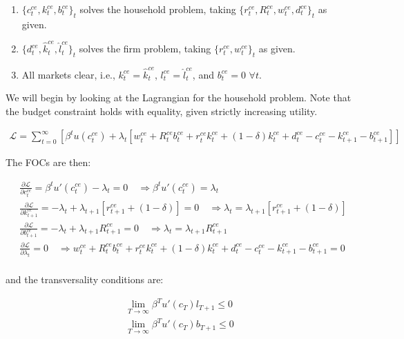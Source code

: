 \begin{enumerate}
    \item $\{c_t^{ce}, k_{t}^{ce}, b_{t}^{ce}\}_t$ solves the household problem, taking $\{r_t^{ce}, R_t^{ce}, w_t^{ce}, d_t^{ce}\}_t$ as given.
    \item $\{d_t^{ce}, \hat{k}_t^{ce}, \hat{l}_t^{ce}\}_t$ solves the firm problem, taking $\{r_t^{ce}, w_t^{ce}\}_t$ as given.
    \item All markets clear, i.e., $k_t^{ce} = \hat{k}_t^{ce}$, $l_t^{ce} = \hat{l}_t^{ce}$, and $b_t^{ce} = 0$ $\forall t$.
\end{enumerate}

We will begin by looking at the Lagrangian for the household problem.
Note that the budget constraint holds with equality, given strictly 
increasing utility. 

\begin{align}
    \mathcal{L} = \sum_{t=0}^\infty \left[\beta^t u(c_t^{ce}) + \lambda_t\left[w_t^{ce} + R_t^{ce}b_t^{ce} + r_t^{ce}k_t^{ce} + (1 - \delta)k_t^{ce} + d_t^{ce} - c_t^{ce} - k_{t+1}^{ce} - b_{t+1}^{ce}\right]\right]
\end{align}

The FOCs are then:

\begin{align}
    &\frac{\partial \mathcal{L}}{\partial c_t^{ce}} = \beta^t u'(c_t^{ce}) - \lambda_t = 0 \quad \Rightarrow \beta^t u'(c_t^{ce}) =\lambda_t \label{eq:pset_2023_24_ps1_q3_golosov_foc1} \\
    &\frac{\partial \mathcal{L}}{\partial k_{t+1}^{ce}} = -\lambda_t + \lambda_{t+1}\left[r_{t+1}^{ce} + (1 - \delta)\right] = 0 \quad \Rightarrow \lambda_t = \lambda_{t+1}\left[r_{t+1}^{ce} + (1 - \delta)\right] \label{eq:pset_2023_24_ps1_q3_golosov_foc2} \\
    &\frac{\partial \mathcal{L}}{\partial b_{t+1}^{ce}} = -\lambda_t + \lambda_{t+1}R_{t+1}^{ce} = 0 \quad \Rightarrow \lambda_t = \lambda_{t+1}R_{t+1}^{ce} \label{eq:pset_2023_24_ps1_q3_golosov_foc3} \\
    &\frac{\partial \mathcal{L}}{\partial \lambda_t} = 0 \quad \Rightarrow w_t^{ce} + R_t^{ce}b_t^{ce} + r_t^{ce}k_t^{ce} + (1 - \delta)k_t^{ce} + d_t^{ce} - c_t^{ce} - k_{t+1}^{ce} - b_{t+1}^{ce} = 0 \label{eq:pset_2023_24_ps1_q3_golosov_foc4} \\
\end{align}

and the transversality conditions are:

\begin{align}
    \lim_{T \to \infty} \beta^Tu'(c_T)l_{T+1} \leq 0\\
    \lim_{T \to \infty} \beta^Tu'(c_T)b_{T+1} \leq 0
\end{align}

